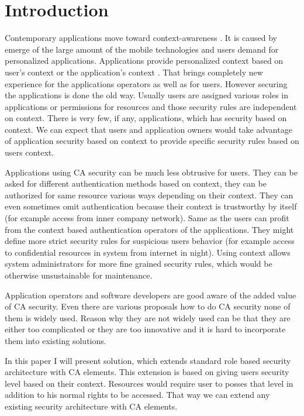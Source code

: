 \documentclass{poster15}
\begin{document}

\section{Introduction}

Contemporary applications move toward context-awareness \cite{context,tomas1}. It is caused by emerge of the large amount of the mobile technologies \cite{mobilecontext} and users demand for personalized applications. Applications provide personalized context based on user's context or the application's context \cite{personalizedcontext}. That brings completely new experience for the applications operators as well as for users. However securing the applications is done the old way. Usually users are assigned various roles in applications or permissions for resources and those security rules are independent on context. There is very few, if any, applications, which has security based on context. We can expect that users and application owners would take advantage of application security based on context to provide specific security rules based on users context.

Applications using CA security can be much less obtrusive for users. They can be asked for different authentication methods based on context, they can be authorized for same resource various ways depending on their context. They can even sometimes omit authentication because their context is trustworthy by itself (for example access from inner company network). Same as the users can profit from the context based authentication operators of the applications. They might define more strict security rules for suspicious users behavior (for example access to confidential resources in system from internet in night). Using context allows system administrators for more fine grained security rules, which would be otherwise unsustainable for maintenance. 

Application operators and software developers are good aware of the added value of CA security. Even there are various proposals how to do CA security none of them is widely used. Reason why they are not widely used can be that they are either too complicated or they are too innovative and it is hard to incorporate them into existing solutions.

In this paper I will present solution, which extends standard role based security architecture with CA elements. This extension is based on giving users security level based on their context. Resources would require user to posses that level in addition to his normal rights to be accessed. That way we can extend any existing security architecture with CA elements.
\end{document}
